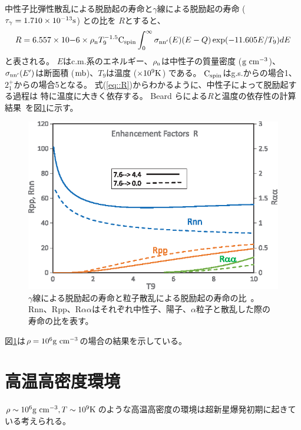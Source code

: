 中性子比弾性散乱による脱励起の寿命と$\gamma$線による脱励起の寿命 ($\tau_{\gamma} = 1.710\times10^{-13} {\rm s}$) との比を
$R$とすると、
\begin{equation}
  R = 6.557\times10{-6}\times\rho_{\rm n}T_{9}^{-1.5}{\rm C}_{{\rm spin}}
  \int^{\infty}_{0}\sigma_{\rm nn'}(E)(E-Q)\exp(-11.605E/T_{9})dE
  \label{eq::R}
\end{equation}
と表される。
$E$はc.m.系のエネルギー、$\rho_{\rm n}$は中性子の質量密度 (${\rm g}~{\rm cm}^{-3}$)、
$\sigma_{\rm nn'}(E')$は断面積 (${\rm mb}$)、$T_{9}$は温度 ($\times10^{9} {\rm K}$) である。
${\rm C}_{{\rm spin}}$はg.s.からの場合1、
$2_{1}^{+}$からの場合5となる。
式(\ref{eq::R})からわかるように、中性子によって脱励起する過程は
特に温度に大きく依存する。
Beard らによる$R$と温度の依存性の計算結果~\cite{hotdensemedium}を図\ref{fig::R}に示す。
\begin{figure}
  \centering
  \includegraphics[clip, width=0.6\columnwidth]{eps/R_T.eps}
  \caption{$\gamma$線による脱励起の寿命と粒子散乱による脱励起の寿命の比~\cite{hotdensemedium}。
    Rnn、Rpp、R$\alpha\alpha$はそれぞれ中性子、陽子、$\alpha$粒子と散乱した際の寿命の比を表す。}
  \label{fig::R}
\end{figure}
図\ref{fig::R}は$\rho = 10^{6}{\rm g}~{\rm cm}^{-3}$の場合の結果を示している。

\section{高温高密度環境}
$\rho\sim10^{6}{\rm g~cm^{-3}}, T\sim10^{9}{\rm K}$のような高温高密度の環境は超新星爆発初期に起きている考えられる。

